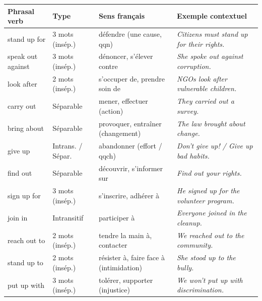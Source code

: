 \documentclass[11pt]{article}
\newcommand{\eng}[1]{\ifmmode\text{\textit{#1}}\else\begingroup\selectlanguage{english}\itshape #1\endgroup\fi}
\begin{document}
\begin{definition}
\begin{center}
\begin{tabularx}{\linewidth}{|l|l|X|X|}
\hline
\rowcolor{popblueL} Phrasal verb & Type & Sens français & Exemple contextuel \\
\hline
stand up for & 3 mots (insép.) & défendre (une cause, qqn) & \eng{Citizens must stand up for their rights.} \\
\hline
speak out against & 3 mots (insép.) & dénoncer, s'élever contre & \eng{She spoke out against corruption.} \\
\hline
look after & 2 mots (insép.) & s'occuper de, prendre soin de & \eng{NGOs look after vulnerable children.} \\
\hline
carry out & Séparable & mener, effectuer (action) & \eng{They carried out a survey.} \\
\hline
bring about & Séparable & provoquer, entraîner (changement) & \eng{The law brought about change.} \\
\hline
give up & Intrans. / Sépar. & abandonner (effort / qqch) & \eng{Don't give up! / Give up bad habits.} \\
\hline
find out & Séparable & découvrir, s'informer sur & \eng{Find out your rights.} \\
\hline
sign up for & 3 mots (insép.) & s'inscrire, adhérer à & \eng{He signed up for the volunteer program.} \\
\hline
join in & Intransitif & participer à & \eng{Everyone joined in the cleanup.} \\
\hline
reach out to & 2 mots (insép.) & tendre la main à, contacter & \eng{We reached out to the community.} \\
\hline
stand up to & 2 mots (insép.) & résister à, faire face à (intimidation) & \eng{She stood up to the bully.} \\
\hline
put up with & 3 mots (insép.) & tolérer, supporter (injustice) & \eng{We won't put up with discrimination.} \\
\hline
\end{tabularx}
\end{center}
\end{definition}
\end{document}

